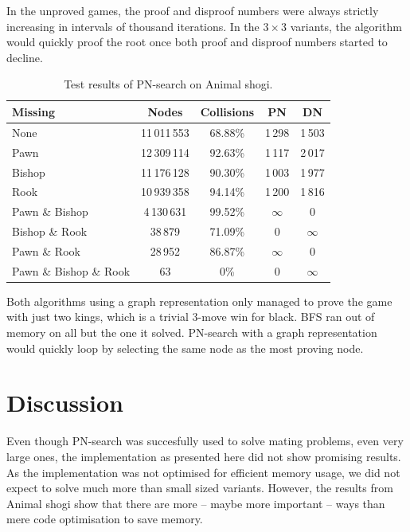 \documentclass{article}
\begin{document}
In the unproved games, the proof and disproof numbers were always strictly increasing in intervals of thousand iterations. In the $3 \times 3$ variants,
the algorithm would quickly proof the root once both proof and disproof numbers started to decline. \\

\begin{table}
\begin{tabular}{| l | c c c c |}
\hline
 Missing & Nodes & Collisions & PN & DN\\ \hline
 None                   & 11\,011\,553  & 68.88\% & 1\,298   & 1\,503\\
 Pawn                   & 12\,309\,114  & 92.63\% & 1\,117   & 2\,017\\
 Bishop                 & 11\,176\,128  & 90.30\% & 1\,003   & 1\,977\\
 Rook                   & 10\,939\,358  & 94.14\% & 1\,200   & 1\,816\\
 Pawn \& Bishop         & 4\,130\,631   & 99.52\% & $\infty$ & 0\\
 Bishop \& Rook         & 38\,879       & 71.09\% & 0        & $\infty$\\
 Pawn \& Rook           & 28\,952       & 86.87\% & $\infty$ & 0\\
 Pawn \& Bishop \& Rook & 63            & 0\%      & 0       & $\infty$\\
\hline
\end{tabular}
\caption{Test results of PN-search on Animal shogi.}
\label{animalresult}
\end{table}

Both algorithms using a graph representation only managed to prove the game with just two kings, which is a trivial 3-move win for black. BFS ran out of memory on all
but the one it solved. PN-search with a graph representation would quickly loop by selecting the same node as the most proving node.

\section{Discussion}
\label{sec:disc}

Even though PN-search was succesfully used to solve mating problems, even very large ones, the implementation as presented here did not show promising results. As the implementation
was not optimised for efficient memory usage, we did not expect to solve much more than small sized variants. However, the results from Animal shogi show that there are more -- maybe
more important -- ways than mere code optimisation to save memory.
\end{document}
